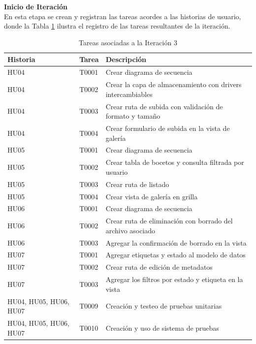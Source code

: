 \documentclass[12pt,letterpaper,oneside]{report}
\newcommand{\tituloparpegado}[1]{\par\textbf{#1}\\\indent\ignorespaces}
\begin{document}
\vspace{0.3cm}
\tituloparpegado{Inicio de Iteración}
En esta etapa se crean y registran las tareas acordes a las historias de usuario, donde la Tabla \ref{tab:tareas3} ilustra el registro de las tareas resultantes de la iteración.

\begin{table}[H]
  \centering
  \caption{Tareas asociadas a la Iteración 3}
  \label{tab:tareas3}
  \renewcommand{\arraystretch}{1.2}
  \begin{tabular}{|l|l|p{7.2cm}|}
    \hline
    \textbf{Historia} & \textbf{Tarea} & \textbf{Descripción} \\
    \hline
    HU04 & T0001 & Crear diagrama de secuencia \\ \hline
    HU04 & T0002 & Crear la capa de almacenamiento con drivers intercambiables \\ \hline
    HU04 & T0003 & Crear ruta de subida con validación de formato y tamaño \\ \hline
    HU04 & T0004 & Crear formulario de subida en la vista de galería \\ \hline
    HU05 & T0001 & Crear diagrama de secuencia \\ \hline
    HU05 & T0002 & Crear tabla de bocetos y consulta filtrada por usuario \\ \hline
    HU05 & T0003 & Crear ruta de listado \\ \hline
    HU05 & T0004 & Crear vista de galería en grilla \\ \hline
    HU06 & T0001 & Crear diagrama de secuencia \\ \hline
    HU06 & T0002 & Crear ruta de eliminación con borrado del archivo asociado \\ \hline
    HU06 & T0003 & Agregar la confirmación de borrado en la vista \\ \hline
    HU07 & T0001 & Agregar etiquetas y estado al modelo de datos \\ \hline
    HU07 & T0002 & Crear ruta de edición de metadatos \\ \hline
    HU07 & T0003 & Agregar los filtros por estado y etiqueta en la vista \\ \hline
    HU04, HU05, HU06, HU07 & T0009 & Creación y testeo de pruebas unitarias \\ \hline
    HU04, HU05, HU06, HU07 & T0010 & Creación y uso de sistema de pruebas \\ \hline
  \end{tabular}
\end{table}
\end{document}

